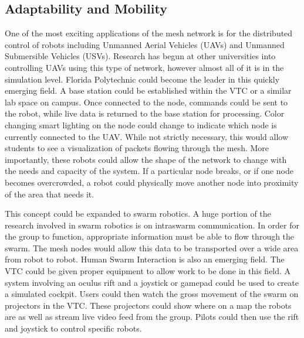 \documentclass{IEEEtran}
\begin{document}
\subsection{Adaptability and Mobility}
One of the most exciting applications of the mesh network is for the distributed control of robots including Unmanned Aerial Vehicles (UAVs) and Unmanned Submersible Vehicles (USVs). Research has begun at other universities into controlling UAVs using this type of network, however almost all of it is in the simulation level. Florida Polytechnic could become the leader in this quickly emerging field. A base station could be established within the VTC or a similar lab space on campus. Once connected to the node, commands could be sent to the robot, while live data is returned to the base station for processing. Color changing smart lighting on the node could change to indicate which node is currently connected to the UAV. While not strictly necessary, this would allow students to see a visualization of packets flowing through the mesh. More importantly, these robots could allow the shape of the network to change with the needs and capacity of the system. If a particular node breaks, or if one node becomes overcrowded, a robot could physically move another node into proximity of the area that needs it. 

This concept could be expanded to swarm robotics. A huge portion of the research involved in swarm robotics is on intraswarm communication. In order for the group to function, appropriate information must be able to flow through the swarm. The mesh nodes would allow this data to be transported over a wide area from robot to robot. Human Swarm Interaction is also an emerging field. The VTC could be given proper equipment to allow work to be done in this field. A system involving an oculus rift and a joystick or gamepad could be used to create a simulated cockpit. Users could then watch the gross movement of the swarm on projectors in the VTC. These projectors could show where on a map the robots are as well as stream live video feed from the group. Pilots could then use the rift and joystick to control specific robots.
\end{document}
